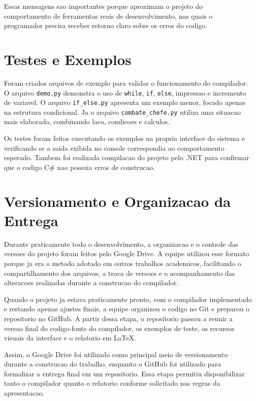 \documentclass[12pt,a4paper]{article}
\begin{document}
Essas mensagens sao importantes porque aproximam o projeto do comportamento de ferramentas reais de desenvolvimento, nas quais o programador precisa receber retorno claro sobre os erros do codigo.

\section{Testes e Exemplos}

Foram criados arquivos de exemplo para validar o funcionamento do compilador. O arquivo \texttt{demo.py} demonstra o uso de \texttt{while}, \texttt{if}, \texttt{else}, impressao e incremento de variavel. O arquivo \texttt{if\_else.py} apresenta um exemplo menor, focado apenas na estrutura condicional. Ja o arquivo \texttt{combate\_chefe.py} utiliza uma situacao mais elaborada, combinando laco, condicoes e calculos.

Os testes foram feitos executando os exemplos na propria interface do sistema e verificando se a saida exibida no console correspondia ao comportamento esperado. Tambem foi realizada compilacao do projeto pelo .NET para confirmar que o codigo C\# nao possuia erros de construcao.

\section{Versionamento e Organizacao da Entrega}

Durante praticamente todo o desenvolvimento, a organizacao e o controle das versoes do projeto foram feitos pelo Google Drive. A equipe utilizou esse formato porque ja era o metodo adotado em outros trabalhos academicos, facilitando o compartilhamento dos arquivos, a troca de versoes e o acompanhamento das alteracoes realizadas durante a construcao do compilador.

Quando o projeto ja estava praticamente pronto, com o compilador implementado e restando apenas ajustes finais, a equipe organizou o codigo no Git e preparou o repositorio no GitHub. A partir dessa etapa, o repositorio passou a reunir a versao final do codigo-fonte do compilador, os exemplos de teste, os recursos visuais da interface e o relatorio em LaTeX.

Assim, o Google Drive foi utilizado como principal meio de versionamento durante a construcao do trabalho, enquanto o GitHub foi utilizado para formalizar a entrega final em um repositorio. Essa etapa permitiu disponibilizar tanto o compilador quanto o relatorio conforme solicitado nas regras da apresentacao.
\end{document}

